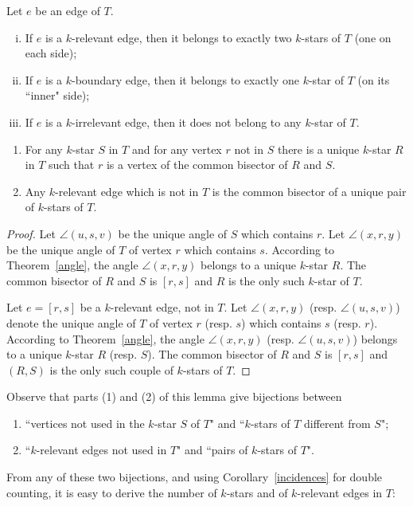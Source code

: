 \documentclass[12pt]{amsart}
\begin{document}
\begin{corollary}\label{incidences}
Let $e$ be an edge of $T$.
\begin{enumerate}[(i)]
\item If $e$ is a $k$-relevant edge, then it belongs to exactly two $k$-stars of $T$ (one on each side);
\item If $e$ is a $k$-boundary edge, then it belongs to exactly one $k$-star of $T$ (on its ``inner" side); \item If $e$ is a $k$-irrelevant edge, then it does not belong to any $k$-star of $T$.
\end{enumerate}
\end{corollary}

\begin{corollary}\label{findingstars}
\begin{enumerate}
\item For any $k$-star $S$ in $T$ and for any vertex $r$ not in $S$ there is a unique $k$-star $R$ in $T$ such that $r$ is a vertex of the common bisector of $R$ and $S$.
\item Any $k$-relevant edge which is not in $T$ is the common bisector of a unique pair of $k$-stars of $T$.
\end{enumerate}
\end{corollary}

\begin{proof}
Let $\angle(u,s,v)$ be the unique angle of $S$ which contains $r$. Let $\angle(x,r,y)$ be the unique angle of $T$ of vertex $r$ which contains $s$. According to Theorem~\ref{angle}, the angle $\angle(x,r,y)$ belongs to a unique $k$-star $R$. The common bisector of $R$ and $S$ is $[r,s]$ and $R$ is the only such $k$-star of $T$.

Let $e=[r,s]$ be a $k$-relevant edge, not in $T$. Let $\angle(x,r,y)$ (resp. $\angle(u,s,v)$) denote the unique angle of $T$ of vertex $r$ (resp. $s$) which contains $s$ (resp. $r$). According to Theorem~\ref{angle}, the angle $\angle(x,r,y)$ (resp. $\angle(u,s,v)$) belongs to a unique $k$-star $R$ (resp. $S$). The common bisector of $R$ and $S$ is $[r,s]$ and $(R,S)$ is the only such couple of $k$-stars of $T$.
\end{proof}

Observe that parts (1) and (2) of this lemma give bijections between 
\begin{enumerate}
\item ``vertices not used in the $k$-star $S$ of $T$" and ``$k$-stars of $T$ different from $S$";
\item ``$k$-relevant edges not used in $T$" and ``pairs of $k$-stars of $T$".
\end{enumerate}
From any of these two bijections, and using Corollary~\ref{incidences} for double counting, it is easy to derive the number of $k$-stars and of $k$-relevant edges in $T$:
\end{document}
